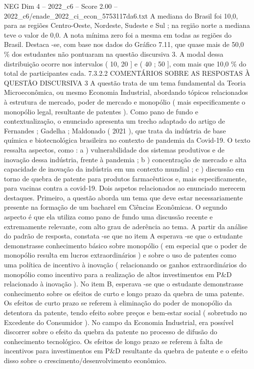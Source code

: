\begin{textsample}{NEG Dim 4 – 2022\_c6 – Score 2.00 – 2022\_c6/enade\_2022\_ci\_econ\_5753117da6.txt}
A mediana do Brasil foi 10,0, para as regiões Centro-Oeste, Nordeste, Sudeste e Sul ; na região norte a mediana teve o valor de 0,0.
A nota mínima zero foi a mesma em todas as regiões do Brasil.
Destaca -se, com base nos dados do Gráfico 7.11, que quase mais de 50,0 \% dos estudantes não pontuaram na questão discursiva 3.
A modal dessa distribuição ocorre nos intervalos ( 10, 20 ] e ( 40 ; 50 ], com mais que 10,0 \% do total de participantes cada. 7.3.2.2 COMENTÁRIOS SOBRE AS RESPOSTAS À QUESTÃO DISCURSIVA 3 A questão trata de um tema fundamental da Teoria Microeconômica, ou mesmo Economia Industrial, abordando tópicos relacionados à estrutura de mercado, poder de mercado e monopólio ( mais especificamente o monopólio legal, resultante de patentes ).
Como pano de fundo e contextualização, o enunciado apresenta um trecho adaptado do artigo de Fernandes ; Gadelha ; Maldonado ( 2021 ), que trata da indústria de base química e biotecnológica brasileira no contexto de pandemia da Covid-19.
O texto ressalta aspectos, como : a ) vulnerabilidade dos sistemas produtivos e de inovação dessa indústria, frente à pandemia ; b ) concentração de mercado e alta capacidade de inovação da indústria em um contexto mundial ; c ) discussão em torno de quebra de patente para produtos farmacêuticos e, mais especificamente, para vacinas contra a covid-19.
Dois aspetos relacionados ao enunciado merecem destaques.
Primeiro, a questão aborda um tema que deve estar necessariamente presente na formação de um bacharel em Ciências Econômicas.
O segundo aspecto é que ela utiliza como pano de fundo uma discussão recente e extremamente relevante, com alto grau de aderência ao tema.
A partir da análise do padrão de resposta, constata -se que no item A esperava -se que o estudante demonstrasse conhecimento básico sobre monopólio ( em especial que o poder de monopólio resulta em lucros extraordinários ) e sobre o uso de patentes como uma política de incentivo à inovação ( relacionando os ganhos extraordinários do monopólio como incentivo para a realização de altos investimentos em P\&D relacionado à inovação ).
No item B, esperava -se que o estudante demonstrasse conhecimento sobre os efeitos de curto e longo prazo da quebra de uma patente.
Os efeitos de curto prazo se referem à eliminação do poder de monopólio da detentora da patente, tendo efeito sobre preços e bem-estar social ( sobretudo no Excedente do Consumidor ).
No campo da Economia Industrial, era possível discorrer sobre o efeito da quebra da patente no processo de difusão do conhecimento tecnológico.
Os efeitos de longo prazo se referem à falta de incentivos para investimentos em P\&D resultante da quebra de patente e o efeito disso sobre o crescimento/desenvolvimento econômico.

\end{textsample}
